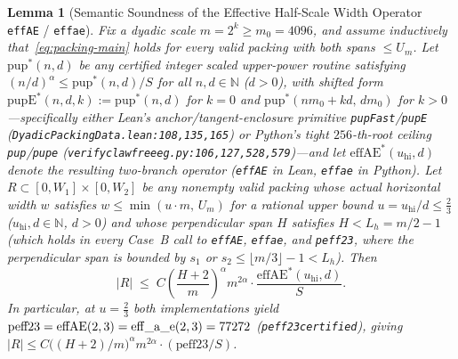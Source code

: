 \documentclass[11pt,reqno]{amsart}
\theoremstyle{plain}
\newtheorem{lemma}[theorem]{Lemma}
\theoremstyle{definition}
\theoremstyle{remark}
\DeclareRobustCommand{\_}{\ifmmode\text{\textunderscore}\else\textunderscore\allowbreak\fi}
\begin{document}
\begin{lemma}[Semantic Soundness of the Effective Half-Scale Width Operator \texttt{effAE} / \texttt{eff\_a\_e}]\label{lem:effae}
Fix a dyadic scale $m = 2^k \ge m_0 = 4096$, and assume inductively that~\eqref{eq:packing-main} holds for every valid packing with both spans $\le U_m$. Let $\mathrm{pup}^*(n, d)$ be any certified integer scaled upper-power routine satisfying $(n/d)^\alpha \le \mathrm{pup}^*(n, d)/S$ for all $n, d \in \mathbb{N}$ ($d > 0$), with shifted form $\mathrm{pupE}^*(n, d, k) := \mathrm{pup}^*(n, d)$ for $k = 0$ and $\mathrm{pup}^*(n m_0 + k d,\, d m_0)$ for $k > 0$---specifically either Lean's anchor/tangent-enclosure primitive \texttt{pupFast}/\texttt{pupE} (\texttt{DyadicPackingData.lean:108,135,165}) or Python's tight $256$-th-root ceiling \texttt{pup}/\texttt{pup\_e} (\texttt{verify\_clawfree\_eg.py:106,127,528,579})---and let $\mathrm{effAE}^*(u_{\mathrm{hi}}, d)$ denote the resulting two-branch operator (\texttt{effAE} in Lean, \texttt{eff\_a\_e} in Python). Let $R \subset [0, W_1] \times [0, W_2]$ be any nonempty valid packing whose actual horizontal width $w$ satisfies $w \le \min(u \cdot m,\, U_m)$ for a rational upper bound $u = u_{\mathrm{hi}} / d \le \frac{2}{3}$ ($u_{\mathrm{hi}}, d \in \mathbb{N}$, $d > 0$) and whose perpendicular span $H$ satisfies $H < L_h = m/2 - 1$ (which holds in every Case~B call to \texttt{effAE}, \texttt{eff\_a\_e}, and \texttt{peff23}, where the perpendicular span is bounded by $s_1$ or $s_2 \le \lfloor m/3 \rfloor - 1 < L_h$). Then
\[
  |R| \;\le\; C \left(\frac{H + 2}{m}\right)^{\!\alpha} m^{2\alpha} \cdot \frac{\mathrm{effAE}^*(u_{\mathrm{hi}}, d)}{S}.
\]
In particular, at $u = \frac{2}{3}$ both implementations yield $\mathrm{peff23} = \mathrm{effAE}(2, 3) = \mathrm{eff\_a\_e}(2, 3) = 77272$ (\texttt{peff23\_certified}), giving $|R| \le C \bigl((H + 2)/m\bigr)^\alpha m^{2\alpha} \cdot (\mathrm{peff23}/S)$.
\end{lemma}
\end{document}
